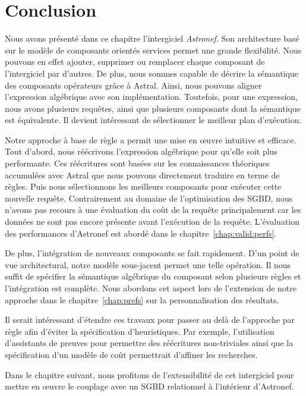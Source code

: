 \section{Conclusion}\label{sec:contrib:astronef:conclusion}
Nous avons présenté dans ce chapitre l'intergiciel \textit{Astronef}. Son architecture basé sur le modèle de composants orientés services permet une grande flexibilité. Nous pouvons en effet ajouter, supprimer ou remplacer chaque composant de l'intergiciel par d'autres. De plus, nous sommes capable de décrire la sémantique des composants opérateurs grâce à Astral. Ainsi, nous pouvons aligner l'expression algébrique avec son implémentation. Toutefois, pour une expression, nous avons plusieurs requêtes, ainsi que plusieurs composants dont la sémantique est équivalente. Il devient intéressant de sélectionner le meilleur plan d'exécution.

Notre approche à base de règle a permit une mise en œuvre intuitive et efficace. Tout d'abord, nous réécrivons l'expression algébrique pour qu'elle soit plus performante. Ces réécritures sont basées sur les connaissances théoriques accumulées avec Astral que nous pouvons directement traduire en terme de règles. Puis nous sélectionnons les meilleurs composants pour exécuter cette nouvelle requête. Contrairement au domaine de l'optimisation des SGBD, nous n'avons pas recours à une évaluation du coût de la requête principalement car les données ne sont pas encore présente avant l'exécution de la requête. L'évaluation des performances d'Astronef est abordé dans le chapitre~\ref{chap:valid:perfs}. 

De plus, l'intégration de nouveaux composants se fait rapidement. D'un point de vue architectural, notre modèle sous-jacent permet une telle opération. Il nous suffit de spécifier la sémantique algébrique du composant selon plusieurs règles et l'intégration est complète. Nous abordons cet aspect lors de l'extension de notre approche dans le chapitre~\ref{chap:prefs} sur la personnalisation des résultats.

Il serait intéressant d'étendre ces travaux pour passer au delà de l'approche par règle afin d'éviter la spécification d'heuristiques. Par exemple, l'utilisation d'assistants de preuves pour permettre des réécritures non-triviales ainsi que la spécification d'un modèle de coût permettrait d'affiner les recherches.

Dans le chapitre suivant, nous profitons de l'extensibilité de cet intergiciel pour mettre en œuvre le couplage avec un SGBD relationnel à l'intérieur d'Astronef.